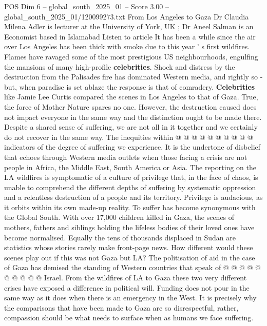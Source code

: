\begin{textsample}{POS Dim 6 – global\_south\_2025\_01 – Score 3.00 – global\_south\_2025\_01/120099273.txt}  \label{ex:f6_pos_446}
From Los Angeles to Gaza Dr Claudia Milena Adler is lecturer at the University of York, UK ; Dr Aneel Salman is an Economist based in Islamabad Listen to article It has been a while since the air over Los Angeles has been thick with smoke due to this year ' s first wildfires.
Flames have ravaged some of the most prestigious US neighbourhoods, engulfing the mansions of many high-profile \textbf{celebrities}.
Shock and distress by the destruction from the Palisades fire has dominated Western media, and rightly so - but, when paradise is set ablaze the response is that of comradery. \textbf{Celebrities} like Jamie Lee Curtis compared the scenes in Los Angeles to that of Gaza.
True, the force of Mother Nature spares no one.
However, the destruction caused does not impact everyone in the same way and the distinction ought to be made there.
Despite a shared sense of suffering, we are not all in it together and we certainly do not recover in the same way.
The inequities within @ @ @ @ @ @ @ @ @ @ indicators of the degree of suffering we experience.
It is the undertone of disbelief that echoes through Western media outlets when those facing a crisis are not people in Africa, the Middle East, South America or Asia.
The reporting on the LA wildfires is symptomatic of a culture of privilege that, in the face of chaos, is unable to comprehend the different depths of suffering by systematic oppression and a relentless destruction of a people and its territory.
Privilege is audacious, as it orbits within its own made-up reality.
To suffer has become synonymous with the Global South.
With over 17,000 children killed in Gaza, the scenes of mothers, fathers and siblings holding the lifeless bodies of their loved ones have become normalised.
Equally the tens of thousands displaced in Sudan are statistics whose stories rarely make front-page news.
How different would these scenes play out if this was not Gaza but LA?
The politisation of aid in the case of Gaza has demised the standing of Western countries that speak of @ @ @ @ @ @ @ @ @ @ Israel.
From the wildfires of LA to Gaza these two very different crises have exposed a difference in political will.
Funding does not pour in the same way as it does when there is an emergency in the West.
It is precisely why the comparisons that have been made to Gaza are so disrespectful, rather, compassion should be what needs to surface when as humans we face suffering.

\end{textsample}
